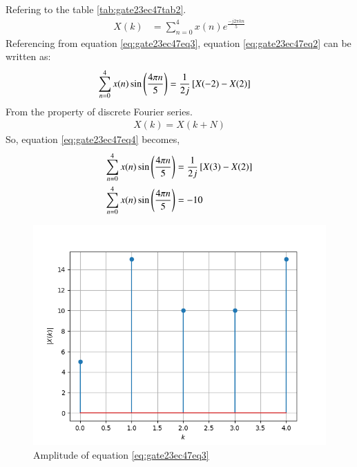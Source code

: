 \documentclass[journal,12pt,onecolumn]{IEEEtran}
\theoremstyle{remark}
\begin{document}
\begin{enumerate}
Refering to the table \ref{tab:gate23ec47tab2}.\\
\begin{align}
X(k)&=\sum\limits_{n=0}^{4} x(n)e^{\frac{-j2\pi kn}{5}}\label{eq:gate23ec47eq3}
\end{align}
Referencing from equation \eqref{eq:gate23ec47eq3}, equation \eqref{eq:gate23ec47eq2} can be written as:
\begin{align}
\sum\limits_{n=0}^{4}x(n) \sin\brak{\frac{4\pi n}{5}}&=\frac{1}{2j}\sbrak{X(-2)-X(2)}\label{eq:gate23ec47eq4}
\end{align}
From the property of discrete Fourier series.\\
\begin{align}
X(k)=X(k+N)
\end{align}
So, equation \eqref{eq:gate23ec47eq4} becomes,\\
\begin{align}
\sum\limits_{n=0}^{4}x(n) \sin\left(\frac{4\pi n}{5}\right)&=\frac{1}{2j}{}\left[X(3)-X(2)\right]\\
\sum\limits_{n=0}^{4}x(n) \sin\left(\frac{4\pi n}{5}\right)&=-10
\end{align}
\begin{figure}[htbp]
    \centering
    \includegraphics[width=\columnwidth]{2023/EC/47/figs/mm1.png}
    \caption{Amplitude of equation \eqref{eq:gate23ec47eq3}}
    \label{fig:gate23ec47fig1}
\end{figure}
\begin{figure}[htbp]
    \centering

\end{figure}
\end{enumerate}
\end{document}
